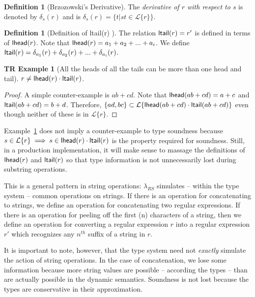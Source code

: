 \documentclass[12pt]{article}
\newtheorem{trexam}[tr]{TR Example}
\theoremstyle{definition}
\newtheorem{defn}[thm]{Definition}
\newcommand{\Lagr}{\mathcal{L}}
\newcommand{\lang}[1]{\Lagr\{#1\}}
\newcommand{\lambdas}{\lambda_{RS}}
\newcommand{\lhead}[1]{ {\sf lhead}(#1) }
\newcommand{\ltail}[1]{ {\sf ltail}(#1) }
\begin{document}
\begin{defn}[Brzozowski's Derivative]\label{def:derivative}
  The \emph{derivative of $r$ with respect to $s$} is denoted by $\delta_s(r)$
  and is $\delta_s(r) = \{t | st \in \lang{r}\}$.
\end{defn}

\begin{defn}[Definition of \ltail{r}]
The relation $\ltail{r} = r'$ is defined in terms of $\lhead{r}$.
Note that $\lhead{r} = a_1 + a_2 + ... + a_i$.
We define $\ltail{r} = \delta_{a_1}(r) + \delta_{a_2}(r) + ... + \delta_{a_i}(r)$.
\end{defn}

\begin{trexam}[All the heads of all the tails can be more than one head and tail]\label{exam:headsandtails}
$r \not = \lhead{r} \cdot \ltail{r}$.
\end{trexam}
\begin{proof}
A simple counter-example is $ab + cd$. 
Note that $\lhead{ab + cd} = a+c$ and $\ltail{ab + cd} = b + d$. 
Therefore, $\{ad,bc\} \subset \lang{\lhead{ab + cd} \cdot \ltail{ab + cd}}$ even though neither of these is in $\lang{r}$.
\end{proof}

Example~\ref{exam:headsandtails} does not imply a counter-example to type soundness because $s \in \lang{r} \implies s \in \lhead{r}\cdot\ltail{r}$ is the
property required for soundness. Still, in a production implementation, it will make sense to massage the definitions of $\lhead{r}$ and $\ltail{r}$ so that type information is not unnecessarily lost during substring operations.

This is a general pattern in string operations: $\lambdas$ simulates -- within the type system -- common operations on strings. 
If there is an operation for concatenating to strings, we define an operation for concatenating two regular expressions.
If there is an operation for peeling off the first (n) characters of a string, then we define an operation for 
converting a regular expression $r$ into a regular expression $r'$ which recognizes any $n^{th}$ suffix of a string in $r$.

It is important to note, however, that the type system need not \emph{exactly} simulate the action of string operations.
In the case of concatenation, we lose some information because more string values are possible -- according the types --
than are actually possible in the dynamic semantics.
Soundness is not lost because the types are conservative in their approximation.
\end{document}
